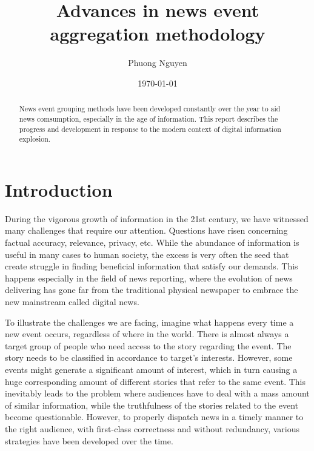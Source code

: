 \documentclass[english]{tktltiki}
\begin{document}
\onehalfspacing

\title{Advances in news event aggregation methodology}
\author{Phuong Nguyen}
\date{\today}

\maketitle




\begin{abstract}

News event grouping methods have been developed constantly over the year to aid news comsumption, especially in the age of information. This report describes the progress and development in response to the modern context of digital information explosion.

\end{abstract}

\mytableofcontents




\section{Introduction}

During the vigorous growth of information in the 21st century, we have witnessed many challenges that require our attention. Questions have risen concerning factual accuracy, relevance, privacy, etc. While the abundance of information is useful in many cases to human society, the excess is very often the seed that create struggle in finding beneficial information that satisfy our demands. This happens especially in the field of news reporting, where the evolution of news delivering has gone far from the traditional physical newspaper to embrace the new mainstream called digital news. 

To illustrate the challenges we are facing, imagine what happens every time a new event occurs, regardless of where in the world. There is almost always a target group of people who need access to the story regarding the event. The story needs to be classified in accordance to target's interests. However, some events might generate a significant amount of interest, which in turn causing a huge corresponding amount of different stories that refer to the same event. This inevitably leads to the problem where audiences have to deal with a mass amount of similar information, while the truthfulness of the stories related to the event become questionable. However, to properly dispatch news in a timely manner to the right audience, with first-class correctness and without redundancy, various strategies have been developed over the time.
\end{document}
